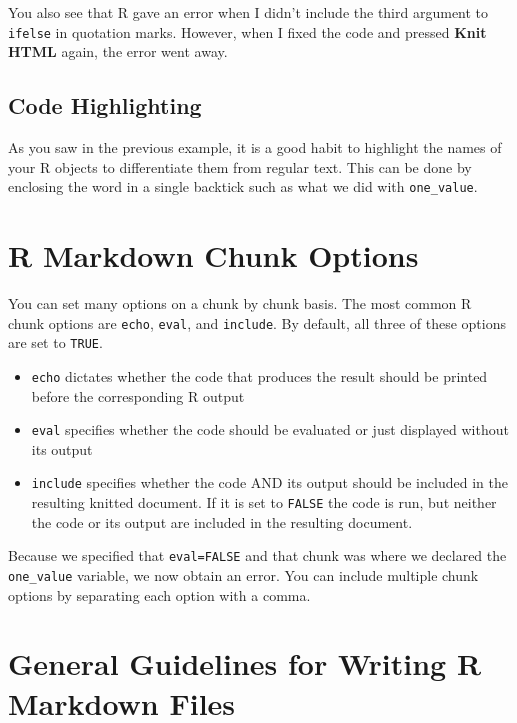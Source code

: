 \documentclass[]{tufte-book}
\begin{document}
You also see that R gave an error when I didn't include the third argument to \texttt{ifelse} in quotation marks. However, when I fixed the code and pressed \textbf{Knit HTML} again, the error went away.

\hypertarget{code-highlighting}{%
\subsection{Code Highlighting}\label{code-highlighting}}

As you saw in the previous example, it is a good habit to highlight the names of your R objects to differentiate them from regular text. This can be done by enclosing the word in a single backtick such as what we did with \texttt{one\_value}.

\hypertarget{r-markdown-chunk-options}{%
\section{R Markdown Chunk Options}\label{r-markdown-chunk-options}}

You can set many options on a chunk by chunk basis. The most common R chunk options are \texttt{echo}, \texttt{eval}, and \texttt{include}. By default, all three of these options are set to \texttt{TRUE}.

\begin{itemize}
\item
  \texttt{echo} dictates whether the code that produces the result should be printed before the corresponding R output
\item
  \texttt{eval} specifies whether the code should be evaluated or just displayed without its output
\item
  \texttt{include} specifies whether the code AND its output should be included in the resulting knitted document. If it is set to \texttt{FALSE} the code is run, but neither the code or its output are included in the resulting document.
\end{itemize}

Because we specified that \texttt{eval=FALSE} and that chunk was where we declared the \texttt{one\_value} variable, we now obtain an error. You can include multiple chunk options by separating each option with a comma.

\hypertarget{general-guidelines-for-writing-r-markdown-files}{%
\section{General Guidelines for Writing R Markdown Files}\label{general-guidelines-for-writing-r-markdown-files}}
\end{document}
